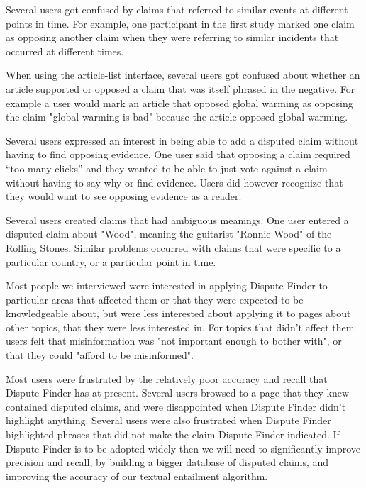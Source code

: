 \documentclass{www2010-submission}
\newcommand{\todo}[1]{}
\begin{document}
Several users got confused by claims that referred to similar events at different points in time. For example, one participant in the first study marked one claim as opposing another claim when they were referring to similar incidents that occurred at different times. 

When using the article-list interface, several users got confused about whether an article supported or opposed a claim that was itself phrased in the negative. For example a user would mark an article that opposed global warming as opposing the claim "global warming is bad" because the article opposed global warming.

Several users expressed an interest in being able to add a disputed claim without having to find opposing evidence. One user said that opposing a claim required ``too many clicks'' and they wanted to be able to just vote against a claim without having to say why or find evidence. Users did however recognize that they would want to see opposing evidence as a reader.

Several users created claims that had ambiguous meanings. One user entered a disputed claim about "Wood", meaning the guitarist "Ronnie Wood" of the Rolling Stones. Similar problems occurred with claims that were specific to a particular country, or a particular point in time. 

Most people we interviewed were interested in applying Dispute Finder to particular areas that affected them or that they were expected to be knowledgeable about, but were less interested about applying it to pages about other topics, that they were less interested in. For topics that didn't affect them users felt that misinformation was "not important enough to bother with", or that they could "afford to be misinformed".

Most users were frustrated by the relatively poor accuracy and recall that Dispute Finder has at present. Several users browsed to a page that they knew contained disputed claims, and were disappointed when Dispute Finder didn't highlight anything. Several users were also frustrated when Dispute Finder highlighted phrases that did not make the claim Dispute Finder indicated. If Dispute Finder is to be adopted widely then we will need to significantly improve precision and recall, by building a bigger database of disputed claims, and improving the accuracy of our textual entailment algorithm.

\todo{Need to say that the argumentation graph contains all existing claims and that it was a simple "supports"/"opposes" graph.}
\end{document}
